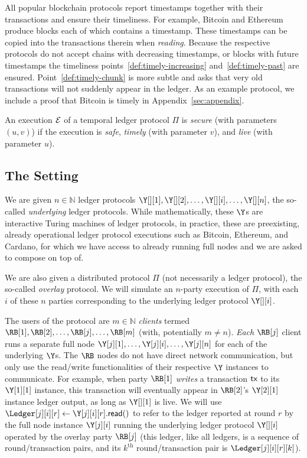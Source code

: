 All popular blockchain protocols report timestamps together with their
transactions and ensure their timeliness. For example, Bitcoin and Ethereum
produce blocks each of which contains a timestamp. These timestamps can be copied
into the transactions therein when \emph{reading}. Because the respective protocols do not accept
chains with decreasing timestamps, or blocks with future timestamps the timeliness
points~\ref{def:timely-increasing} and~\ref{def:timely-past} are ensured.
Point~\ref{def:timely-chunk} is more subtle and asks that very old transactions will
not suddenly appear in the ledger. As an example protocol, we include a proof that Bitcoin is timely in
Appendix~\ref{sec:appendix}.

\begin{definition}
  An execution $\mathcal{E}$ of a temporal ledger protocol $\Pi$ is \emph{secure} (with parameters $(u, v)$) if the execution
  is \emph{safe}, \emph{timely} (with parameter $v$), and \emph{live} (with parameter $u$).
\end{definition}

\subsection{The Setting}

We are given $n \in \mathbb{N}$ ledger protocols
$\Y[][1], \Y[][2], \ldots, \Y[][i], \ldots, \Y[][n]$,
the so-called \emph{underlying} ledger protocols.
While mathematically, these $\Y$s are interactive Turing machines of ledger protocols,
in practice, these are preexisting, already operational ledger protocol executions
such as Bitcoin, Ethereum, and Cardano, for which we have access to already running full nodes
and we are asked to compose on top of.

We are also given a distributed protocol $\Pi$ (not necessarily a ledger protocol),
the so-called \emph{overlay} protocol. We will simulate an $n$-party execution of $\Pi$,
with each $i$ of these $n$ parties corresponding to the underlying ledger protocol $\Y[][i]$.

The users of the protocol are $m \in \mathbb{N}$ \rollerblade \emph{clients} termed
$\RB[1], \RB[2], \ldots, \RB[j], \ldots, \RB[m]$ (with, potentially $m \neq n$).
\emph{Each} $\RB[j]$ client runs a separate full node $\Y[j][1], \ldots, \Y[j][i], \ldots, \Y[j][n]$
for each of the underlying $\Y$s. The $\RB$ nodes do not have direct network communication, but only
use the read/write functionalities of their respective $\Y$ instances to communicate.
For example, when party $\RB[1]$ \emph{writes} a transaction $\textsf{tx}$ to its $\Y[1][1]$ instance,
this transaction will eventually appear in $\RB[2]$'s $\Y[2][1]$ instance ledger output,
as long as $\Y[][1]$ is live.
We will use $\Ledger[j][i][r] \gets \Y[j][i][r].\lread()$ to refer to the ledger reported at
round $r$ by the full node instance $\Y[j][i]$ running the underlying ledger protocol $\Y[][i]$
operated by the overlay party $\RB[j]$
(this ledger, like all ledgers, is a sequence of round/transaction pairs, and its
$k^\text{th}$ round/transaction pair is $\Ledger[j][i][r][k]$).

